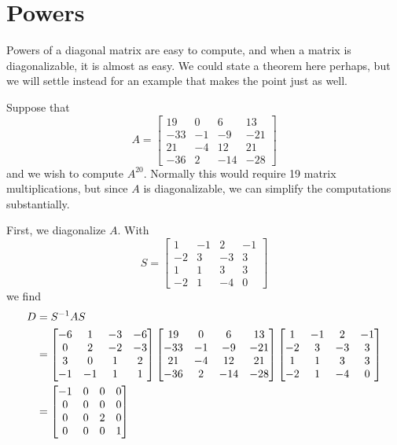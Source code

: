 \documentclass{ximera}
\begin{document}
\section{Powers}

Powers of a diagonal matrix are easy to compute, and when a matrix is diagonalizable, it is almost as easy.  We could state a theorem here perhaps, but we will settle instead for an example that makes the point just as well.

\begin{example}

Suppose that
\[
A=\begin{bmatrix}
 19 & 0 & 6 & 13 \\
 -33 & -1 & -9 & -21 \\
 21 & -4 & 12 & 21 \\
 -36 & 2 & -14 & -28
\end{bmatrix}
\]
and we wish to compute $A^{20}$.  Normally this would require 19 matrix multiplications, but since $A$ is diagonalizable, we can simplify the computations substantially.

First, we diagonalize $A$.  With
\[
S=\begin{bmatrix}
 1 & -1 & 2 & -1 \\
 -2 & 3 & -3 & 3 \\
 1 & 1 & 3 & 3 \\
 -2 & 1 & -4 & 0
\end{bmatrix}
\]
we find
\begin{align*}
D&=S^{-1}AS\\
&=
\begin{bmatrix}
 -6 & 1 & -3 & -6 \\
 0 & 2 & -2 & -3 \\
 3 & 0 & 1 & 2 \\
 -1 & -1 & 1 & 1
\end{bmatrix}
\begin{bmatrix}
 19 & 0 & 6 & 13 \\
 -33 & -1 & -9 & -21 \\
 21 & -4 & 12 & 21 \\
 -36 & 2 & -14 & -28
\end{bmatrix}
\begin{bmatrix}
 1 & -1 & 2 & -1 \\
 -2 & 3 & -3 & 3 \\
 1 & 1 & 3 & 3 \\
 -2 & 1 & -4 & 0
\end{bmatrix}\\
&=
\begin{bmatrix}
 -1 & 0 & 0 & 0 \\
 0 & 0 & 0 & 0 \\
 0 & 0 & 2 & 0 \\
 0 & 0 & 0 & 1
\end{bmatrix}
\end{align*}



\end{example}
\end{document}

